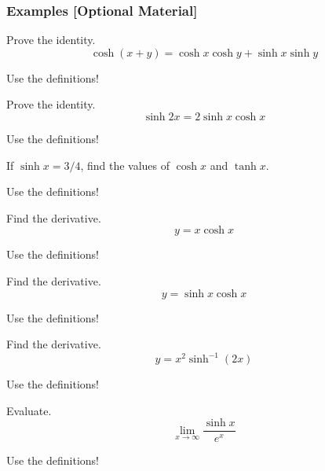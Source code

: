 \documentclass[12pt,addpoints, answers, fleqn]{exam}
\begin{document}
\subsubsection{Examples  [Optional Material]}

\begin{questions}
\question Prove the identity.
\[
\cosh \left( x+y \right) = \cosh x  \cosh y + \sinh x  \sinh y
\]
\begin{solution}
Use the definitions!
\end{solution}

\question Prove the identity.
\[
\sinh 2x = 2 \sinh x \cosh x
\]
\begin{solution}
Use the definitions!
\end{solution}

\question If $\sinh x = 3/4$, find the values of $\cosh x$ and $\tanh x$.
\begin{solution}
Use the definitions!
\end{solution}

\question Find the derivative.
\[
y = x \cosh x
\]
\begin{solution}
Use the definitions!
\end{solution}

\question Find the derivative.
\[
y = \sinh x \cosh x
\]
\begin{solution}
Use the definitions!
\end{solution}

\question Find the derivative.
\[
y = x^2 \sinh^{-1} \left(2x\right)
\]
\begin{solution}
Use the definitions!
\end{solution}

\question Evaluate.
\[
\mathop {\lim }\limits_{ x \to \infty}  \frac{\sinh x}{e^x}
\]
\begin{solution}
Use the definitions!
\end{solution}

\end{questions}


\vfill
\pagebreak
\end{document}
